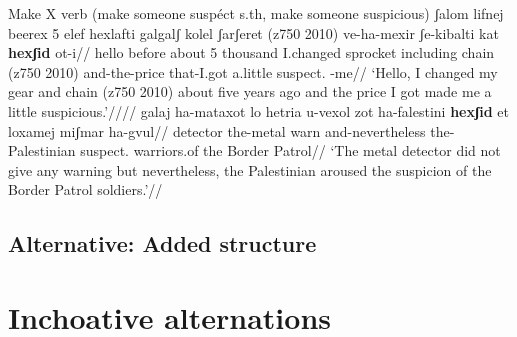 \pex Make X verb (make someone suspéct s.th, make someone suspicious)
	\a \begingl
		\gla ʃalom lifnej beerex 5 elef hexlafti galgalʃ kolel ʃarʃeret (z750 2010) ve-ha-mexir ʃe-kibalti k{\texttslig}at \textbf{hexʃid} ot-i//
		\glb hello before about 5 thousand I.changed sprocket including chain (z750 2010) and-the-price that-I.got a.little suspect. -me//
		\glft `Hello, I changed my gear and chain (z750 2010) about five years ago and the price I got made me a little suspicious.'////
	\endgl
	\a \begingl
		\gla galaj ha-mataxot lo hetria u-{vexol zot} ha-falestini \textbf{hexʃid} et loxamej {miʃmar ha-gvul}//
		\glb detector the-metal  warn and-nevertheless the-Palestinian suspect.  warriors.of {the Border Patrol}//
		\glft `The metal detector did not give any warning but nevertheless, the Palestinian aroused the suspicion of the Border Patrol soldiers.'//
	\endgl
\xe



%	
%	
%	
%


	
	\subsection{Alternative: Added structure}



\section{Inchoative alternations} \label{vd:inch}




